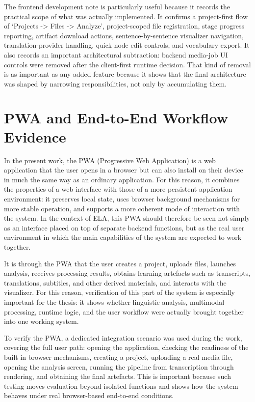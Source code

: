 \documentclass[12pt,a4paper,oneside]{report}
\begin{document}
The frontend development note is particularly useful because it records the practical scope of what was actually implemented. It confirms a project-first flow of `Projects -> Files -> Analyze', project-scoped file registration, stage progress reporting, artifact download actions, sentence-by-sentence visualizer navigation, translation-provider handling, quick node edit controls, and vocabulary export. It also records an important architectural subtraction: backend media-job UI controls were removed after the client-first runtime decision. That kind of removal is as important as any added feature because it shows that the final architecture was shaped by narrowing responsibilities, not only by accumulating them.

\section{PWA and End-to-End Workflow Evidence}

In the present work, the PWA (Progressive Web Application) is a web application that the user opens in a browser but can also install on their device in much the same way as an ordinary application. For this reason, it combines the properties of a web interface with those of a more persistent application environment: it preserves local state, uses browser background mechanisms for more stable operation, and supports a more coherent mode of interaction with the system. In the context of ELA, this PWA should therefore be seen not simply as an interface placed on top of separate backend functions, but as the real user environment in which the main capabilities of the system are expected to work together.

It is through the PWA that the user creates a project, uploads files, launches analysis, receives processing results, obtains learning artefacts such as transcripts, translations, subtitles, and other derived materials, and interacts with the visualizer. For this reason, verification of this part of the system is especially important for the thesis: it shows whether linguistic analysis, multimodal processing, runtime logic, and the user workflow were actually brought together into one working system.

To verify the PWA, a dedicated integration scenario was used during the work, covering the full user path: opening the application, checking the readiness of the built-in browser mechanisms, creating a project, uploading a real media file, opening the analysis screen, running the pipeline from transcription through rendering, and obtaining the final artefacts. This is important because such testing moves evaluation beyond isolated functions and shows how the system behaves under real browser-based end-to-end conditions.
\end{document}
